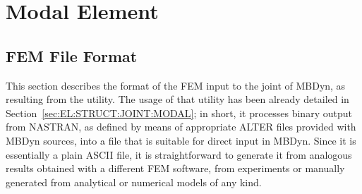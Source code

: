 %
%
%
%
%
% 
%
%

\chapter{Modal Element}

\section{FEM File Format}
\label{sec:APP:EL:STRUCT:JOINT:MODAL:FORMAT}

This section describes the format of the FEM input to the 
joint of MBDyn, as resulting from the  utility.
The usage of that utility has been already detailed 
in Section~\ref{sec:EL:STRUCT:JOINT:MODAL}; in short, it processes
binary output from NASTRAN, as defined by means of appropriate
ALTER files provided with MBDyn sources, into a file that is suitable
for direct input in MBDyn.
Since it is essentially a plain ASCII file, it is straightforward
to generate it from analogous results obtained with a different 
FEM software, from experiments or manually generated from analytical
or numerical models of any kind.

